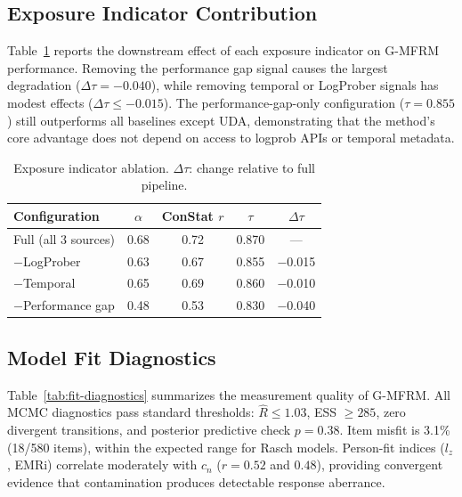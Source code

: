 \documentclass[11pt]{article}
\newcommand{\gmfrm}{\textsc{G-MFRM}}
\newcommand{\cn}{c_n}
\begin{document}
\subsection{Exposure Indicator Contribution}

Table~\ref{tab:ei-ablation} reports the downstream effect of each exposure indicator on \gmfrm{} performance. Removing the performance gap signal causes the largest degradation ($\Delta\tau = -0.040$), while removing temporal or LogProber signals has modest effects ($\Delta\tau \leq -0.015$). The performance-gap-only configuration ($\tau = 0.855$) still outperforms all baselines except UDA, demonstrating that the method's core advantage does not depend on access to logprob APIs or temporal metadata.

\begin{table}[t]
\centering
\caption{Exposure indicator ablation. $\Delta\tau$: change relative to full pipeline.}
\label{tab:ei-ablation}
\small
\begin{tabular}{@{}lcccc@{}}
\toprule
Configuration & $\alpha$ & ConStat $r$ & $\tau$ & $\Delta\tau$ \\
\midrule
Full (all 3 sources) & 0.68 & 0.72 & 0.870 & --- \\
$-$LogProber & 0.63 & 0.67 & 0.855 & $-$0.015 \\
$-$Temporal & 0.65 & 0.69 & 0.860 & $-$0.010 \\
$-$Performance gap & 0.48 & 0.53 & 0.830 & $-$0.040 \\
\bottomrule
\end{tabular}
\end{table}

\subsection{Model Fit Diagnostics}

Table~\ref{tab:fit-diagnostics} summarizes the measurement quality of \gmfrm{}. All MCMC diagnostics pass standard thresholds: $\hat{R} \leq 1.03$, ESS $\geq 285$, zero divergent transitions, and posterior predictive check $p = 0.38$. Item misfit is 3.1\% (18/580 items), within the expected range for Rasch models. Person-fit indices ($l_z$, EMRi) correlate moderately with $\cn$ ($r = 0.52$ and $0.48$), providing convergent evidence that contamination produces detectable response aberrance.
\end{document}
